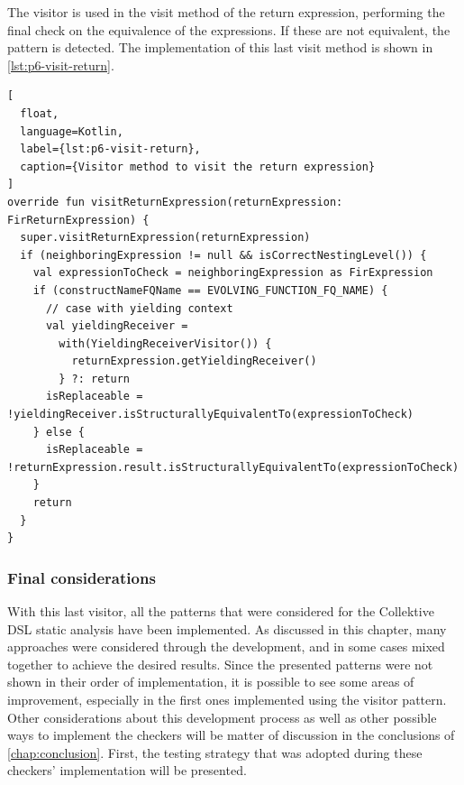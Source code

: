 \documentclass[12pt,a4paper,openright,twoside]{book}
\begin{document}


The visitor is used in the visit method of the return expression, performing the
final check on the equivalence of the expressions. If these are not equivalent,
the pattern is detected. The implementation of this last visit method is shown
in \cref{lst:p6-visit-return}.

\begin{lstlisting}[
  float, 
  language=Kotlin,
  label={lst:p6-visit-return},
  caption={Visitor method to visit the return expression}
]
override fun visitReturnExpression(returnExpression: FirReturnExpression) {
  super.visitReturnExpression(returnExpression)
  if (neighboringExpression != null && isCorrectNestingLevel()) {
    val expressionToCheck = neighboringExpression as FirExpression
    if (constructNameFQName == EVOLVING_FUNCTION_FQ_NAME) {
      // case with yielding context
      val yieldingReceiver =
        with(YieldingReceiverVisitor()) {
          returnExpression.getYieldingReceiver()
        } ?: return
      isReplaceable = !yieldingReceiver.isStructurallyEquivalentTo(expressionToCheck)
    } else {
      isReplaceable = !returnExpression.result.isStructurallyEquivalentTo(expressionToCheck)
    }
    return
  }
}
\end{lstlisting}

\subsubsection{Final considerations}

With this last visitor, all the patterns that were considered for the Collektive
\ac{DSL} static analysis have been implemented. As discussed in this chapter,
many approaches were considered through the development, and in some cases mixed
together to achieve the desired results. Since the presented patterns were not
shown in their order of implementation, it is possible to see some areas of
improvement, especially in the first ones implemented using the visitor pattern. 
%
Other considerations about this development process as well as other possible 
ways to implement the checkers will be matter of discussion in the conclusions 
of \cref{chap:conclusion}. First, the testing strategy that was adopted during 
these checkers' implementation will be presented.

\end{document}
